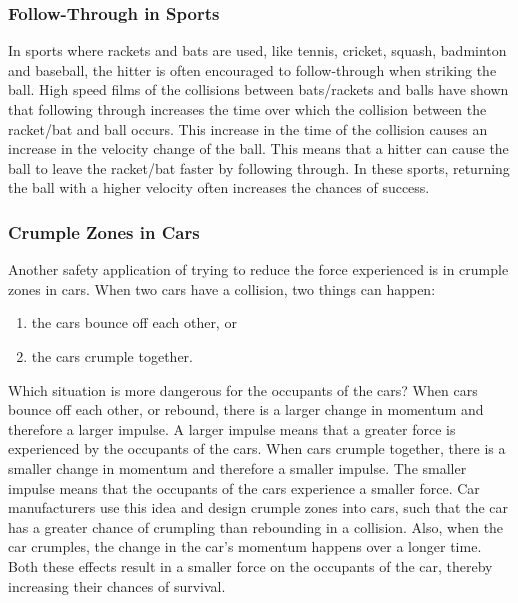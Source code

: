 \subsubsection{Follow-Through in Sports}
In sports where rackets and bats are used, like tennis, cricket, squash, badminton and baseball, the hitter is often encouraged to follow-through when striking the ball. High speed films of the collisions between bats/rackets and balls have shown that following through increases the time over which the collision between the racket/bat and ball occurs. This increase in the time of the collision causes an increase in the velocity change of the ball. This means that a hitter can cause the ball to leave the racket/bat faster by following through. In these sports, returning the ball with a higher velocity often increases the chances of success.

\subsubsection{Crumple Zones in Cars}
Another safety application of trying to reduce the force experienced is in crumple zones in cars. When two cars have a collision, two things can happen:
\begin{enumerate}
\item the cars bounce off each other, or
\item the cars crumple together.
\end{enumerate}

Which situation is more dangerous for the occupants of the cars? When cars bounce off each other, or rebound, there is a larger change in momentum and therefore a larger impulse. A larger impulse means that a greater force is experienced by the occupants of the cars. When cars crumple together, there is a smaller change in momentum and therefore a smaller impulse. The smaller impulse means that the occupants of the cars experience a smaller force. Car manufacturers use this idea and design crumple zones into cars, such that the car has a greater chance of crumpling than rebounding in a collision. Also, when the car crumples, the change in the car's momentum happens over a longer time. Both these effects result in a smaller force on the occupants of the car, thereby increasing their chances of survival.


